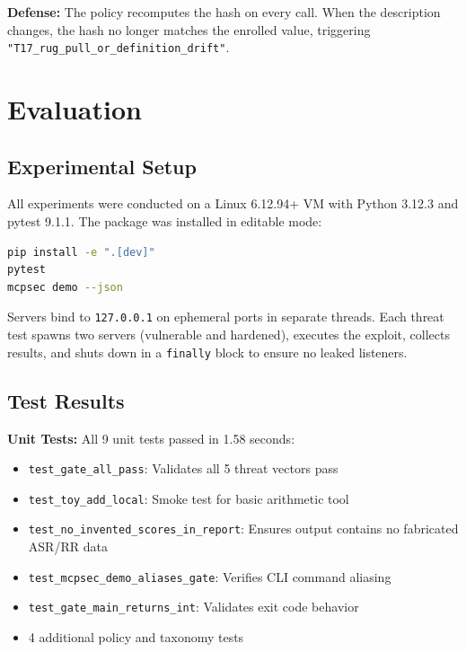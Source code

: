 \documentclass[11pt]{article}
\begin{document}
\textbf{Defense:} The policy recomputes the hash on every call. When the description changes, the hash no longer matches the enrolled value, triggering \texttt{"T17\_rug\_pull\_or\_definition\_drift"}.

\section{Evaluation}
\label{sec:eval}

\subsection{Experimental Setup}

All experiments were conducted on a Linux 6.12.94+ VM with Python 3.12.3 and pytest 9.1.1. The package was installed in editable mode:

\begin{lstlisting}[language=bash]
pip install -e ".[dev]"
pytest
mcpsec demo --json
\end{lstlisting}

Servers bind to \texttt{127.0.0.1} on ephemeral ports in separate threads. Each threat test spawns two servers (vulnerable and hardened), executes the exploit, collects results, and shuts down in a \texttt{finally} block to ensure no leaked listeners.

\subsection{Test Results}

\textbf{Unit Tests:} All 9 unit tests passed in 1.58 seconds:

\begin{itemize}
    \item \texttt{test\_gate\_all\_pass}: Validates all 5 threat vectors pass
    \item \texttt{test\_toy\_add\_local}: Smoke test for basic arithmetic tool
    \item \texttt{test\_no\_invented\_scores\_in\_report}: Ensures output contains no fabricated ASR/RR data
    \item \texttt{test\_mcpsec\_demo\_aliases\_gate}: Verifies CLI command aliasing
    \item \texttt{test\_gate\_main\_returns\_int}: Validates exit code behavior
    \item 4 additional policy and taxonomy tests
\end{itemize}
\end{document}
